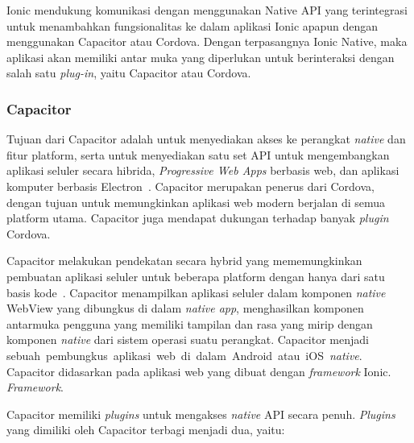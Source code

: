Ionic mendukung komunikasi dengan menggunakan Native API yang terintegrasi untuk menambahkan fungsionalitas ke dalam aplikasi Ionic apapun dengan menggunakan Capacitor atau Cordova. Dengan terpasangnya Ionic Native, maka aplikasi akan memiliki antar muka yang diperlukan untuk berinteraksi dengan salah satu {\it plug-in}, yaitu Capacitor atau Cordova.

\subsubsection{Capacitor}
\label{subsec:capacitor}
Tujuan dari Capacitor adalah untuk menyediakan akses ke perangkat {\it native} dan fitur platform, serta untuk menyediakan satu set API untuk mengembangkan aplikasi seluler secara hibrida, {\it Progressive Web Apps} berbasis web, dan aplikasi komputer berbasis Electron~\cite{tor:19:software}. Capacitor merupakan penerus dari Cordova, dengan tujuan untuk memungkinkan aplikasi web modern berjalan di semua platform utama. Capacitor juga mendapat dukungan terhadap banyak {\it plugin} Cordova.

Capacitor melakukan pendekatan secara hybrid yang mememungkinkan pembuatan aplikasi seluler untuk beberapa platform dengan hanya dari satu basis kode~\cite{huber:21:pwa}. Capacitor menampilkan aplikasi seluler dalam komponen \textit{native} WebView yang dibungkus di dalam \textit{native app}, menghasilkan komponen antarmuka pengguna yang memiliki tampilan dan rasa yang mirip dengan komponen \textit{native} dari sistem operasi suatu perangkat. Capacitor menjadi sebuah~pembungkus~aplikasi~web~di~dalam~Android~atau~iOS~\textit{native}. Capacitor didasarkan pada aplikasi web yang dibuat dengan \textit{framework} Ionic. \textit{Framework}.

Capacitor memiliki \textit{plugins} untuk mengakses \textit{native} API secara penuh. \textit{Plugins} yang dimiliki oleh Capacitor terbagi menjadi dua, yaitu:

